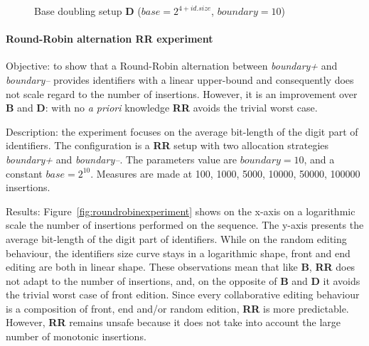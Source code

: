\begin{figure}
\small
\begin{center}

\caption{Base doubling setup \textbf{D} ($base=2^{4+id.size}$, $boundary=10$)}
\label{fig:doubleexperiment}
\end{center}
\end{figure}

\paragraph{Round-Robin alternation \textbf{RR} experiment}

\begin{asparadesc}
  \item[Objective:] to show that a Round-Robin alternation between
    \emph{boundary+} and \emph{boundary--} provides identifiers with a linear
    upper-bound and consequently does not scale regard to the number of
    insertions.  However, it is an improvement over \textbf{B} and \textbf{D}:
    with no \emph{a priori} knowledge \textbf{RR} avoids the trivial worst
    case.

  \item[Description:] the experiment focuses on the average bit-length of the
    digit part of identifiers. The configuration is a \textbf{RR} setup with
    two allocation strategies \emph{boundary+} and \emph{boundary--}. The
    parameters value are $boundary=10$, and a constant $base=2^{10}$. Measures
    are made at 100, 1000, 5000, 10000, 50000, 100000 insertions.

  \item[Results:] Figure~\ref{fig:roundrobinexperiment} shows on the x-axis on
    a logarithmic scale the number of insertions performed on the sequence. The
    y-axis presents the average bit-length of the digit part of identifiers.
    While on the random editing behaviour, the identifiers size curve stays in
    a logarithmic shape, front and end editing are both in linear shape. These
    observations mean that like \textbf{B}, \textbf{RR} does not adapt to the
    number of insertions, and, on the opposite of \textbf{B} and \textbf{D} it
    avoids the trivial worst case of front edition. Since every collaborative
    editing behaviour is a composition of front, end and/or random edition,
    \textbf{RR} is more predictable. However, \textbf{RR} remains unsafe
    because it does not take into account the large number of monotonic
    insertions.


\end{asparadesc}
